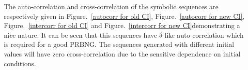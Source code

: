 The auto-correlation and cross-correlation of the symbolic sequences are respectively given in Figure.~\ref{autocorr for old CI}, Figure.~\ref{autocorr for new CI}, Figure.~\ref{intercorr for old CI} and Figure.~\ref{intercorr for new CI}demonstrating a nice nature. It can be seen that this sequences have $\delta$-like auto-correlation which is required for a good PRBNG. The sequences generated with different initial values will have zero cross-correlation due to the sensitive dependence on initial conditions. 



\begin{figure}
\centering
{} \hspace{0.5cm}
\end{figure}
